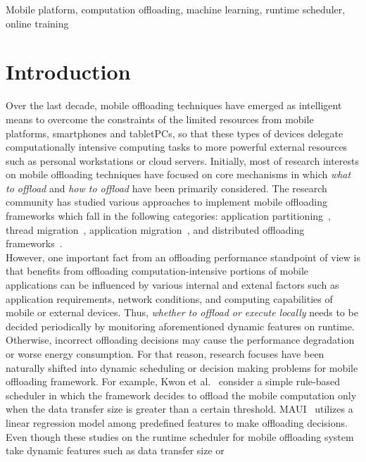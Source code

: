 \documentclass[10pt, conference, compsocconf]{IEEEtran}
\begin{document}
\begin{IEEEkeywords}
Mobile platform, computation offloading, machine learning, runtime
scheduler, online training
\end{IEEEkeywords}

\section{Introduction}
%
Over the last decade, mobile offloading techniques have emerged as
intelligent means to overcome the constraints of the limited resources
from mobile platforms, smartphones and tabletPCs, so that these types of
devices delegate computationally intensive computing tasks to more
powerful external resources such as personal workstations or cloud
servers.
%
Initially, most of research interests on mobile offloading techniques
have focused on core mechanisms in which \textit{what to offload} and
\textit{how to offload} have been primarily considered. 
%
The research community has studied various approaches to implement mobile
offloading frameworks which fall in the following categories:
application partitioning~\cite{spectra, maui, cuckoo}, thread
migration~\cite{clonecloud, comet}, application migration~\cite{hung},
and distributed offloading frameworks~\cite{mmr, sonora, serendipity}.\\
%
\indent However, one important fact from an offloading performance
standpoint of view is that benefits from offloading
computation-intensive portions of mobile applications can be influenced
by various internal and extenal factors such as application
requirements, network conditions, and computing capabilities of mobile
or external devices.
%
Thus, \textit{whether to offload or execute locally} needs to be
decided periodically by monitoring aforementioned dynamic features on
runtime.
%
Otherwise, incorrect offloading decisions may cause the performance
degradation or worse energy consumption.
%
For that reason, research focuses have been naturally shifted into
dynamic scheduling or decision making problems for mobile offloading
framework.
%
For example, Kwon et al.~\cite{kwon} consider a simple rule-based
scheduler in which the framework decides to offload the mobile
computation only when the data transfer size is greater than a certain
threshold.
%
MAUI~\cite{maui} utilizes a linear regression model among predefined
features to make offloading decisions.\\
%
\indent Even though these studies on the runtime scheduler for mobile
offloading system take dynamic features such as data transfer size or
\end{document}
